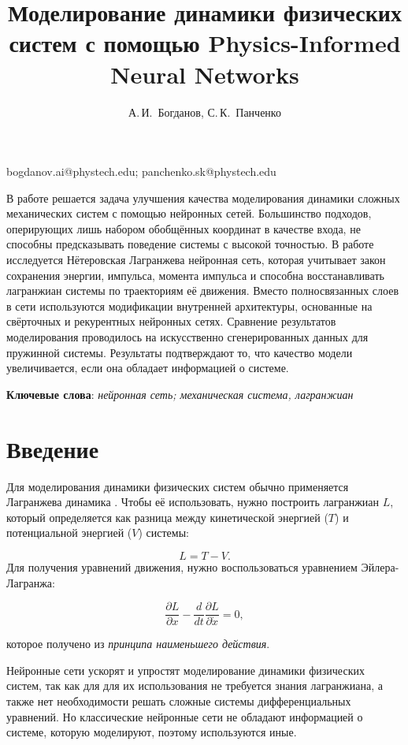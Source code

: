 \documentclass[12pt, twoside]{article}
\begin{document}
\title
    {Моделирование динамики физических систем с помощью Physics-Informed Neural Networks}
\author
    {А.\,И.~Богданов, С.\,К.~Панченко} 
\email
    {bogdanov.ai@phystech.edu; panchenko.sk@phystech.edu}
\abstract
    {В работе решается задача улучшения качества моделирования динамики сложных механических систем с помощью нейронных сетей. Большинство подходов, оперирующих лишь набором обобщённых координат в качестве входа, не способны предсказывать поведение системы с высокой точностью.
    В работе исследуется Нётеровская Лагранжева нейронная сеть, которая учитывает закон сохранения энергии, импульса, момента импульса и способна восстанавливать лагранжиан системы по траекториям её движения. Вместо полносвязанных слоев в сети используются модификации внутренней архитектуры, основанные на свёрточных и рекурентных нейронных сетях. Сравнение результатов моделирования проводилось на искусственно сгенерированных данных для пружинной системы. Результаты подтверждают то, что качество модели увеличивается, если она обладает информацией о системе.
\bigskip

\noindent
\textbf{Ключевые слова}: \emph {нейронная сеть; механическая система, лагранжиан}

\receivedRus{-}
\receivedEng{-}
}

\maketitle

\section{Введение}
 
    Для моделирования динамики физических систем обычно применяется Лагранжева динамика \cite{landau1976mechanics}. Чтобы её использовать, нужно построить лагранжиан $L$, который определяется как разница между кинетической энергией ($T$) и потенциальной энергией ($V$) системы:

    $$L = T - V.$$
    Для получения уравнений движения, нужно воспользоваться уравнением Эйлера-Лагранжа:

    $$\frac{\partial L}{\partial x} - \frac{d}{dt} \frac{\partial L}{\partial \dot{x}} = 0,$$
    
    которое получено из \emph{принципа наименьшего действия}.

    Нейронные сети ускорят и упростят моделирование динамики физических систем, так как для для их использования не требуется знания лагранжиана, а также нет необходимости решать сложные системы дифференциальных уравнений. Но классические нейронные сети не обладают информацией о системе, которую моделируют, поэтому используются иные.
\end{document}
